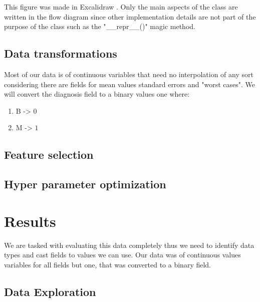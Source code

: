 \documentclass[12pt, a4paper]{article}
\begin{document}
\begin{multicols}{2}

    This figure was made in Excalidraw \cite{}. Only the main aspects of the class are written in the flow diagram since other implementation details are not part of the purpose of the class such as the "__repr__()" magic method.
    \newline

    \subsection{Data transformations} \label{subsec:transforms}

    Most of our data is of continuous variables that need no interpolation of any sort considering there are fields for mean values standard errors and "worst cases". We will convert the diagnosis field to a binary values one where:
    \newline

    \begin{enumerate} \label{enm:casting}
        \item B -> $0$
        \item M -> $1$
    \end{enumerate}

    \subsection{Feature selection} \label{subsec:fselect}

    \subsection{Hyper parameter optimization} \label{subsec:optuna}

    \section{Results} \label{sec:res}

    We are tasked with evaluating this data completely thus we need to identify data types and cast fields to values we can use. Our data was of continuous values variables for all fields but one, that was converted to a binary field.
    \newline

    \subsection{Data Exploration} \label{subsec:expl}

\end{multicols}
\end{document}
